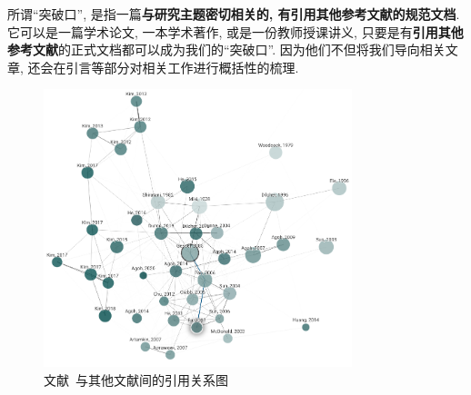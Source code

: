 \documentclass{booki}
\begin{document}
所谓``突破口'', 是指一篇\textbf{与研究主题密切相关的, 有引用其他参考文献的规范文档}. 它可以是一篇学术论文, 一本学术著作, 或是一份教师授课讲义, 只要是有\textbf{引用其他参考文献}的正式文档都可以成为我们的``突破口''. 因为他们不但将我们导向相关文章, 还会在引言等部分对相关工作进行概括性的梳理.

\begin{figure}[H]
    \centering
    \includegraphics[width=0.8\textwidth]{figure/graph.png}
    \caption{文献~\cite{GesselMiki2005}与其他文献间的引用关系图}
    \label{fig:mikiGrapg}
\end{figure}
\end{document}
